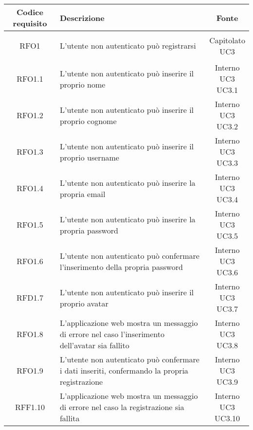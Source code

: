 \begin{longtable}{|c|p{8cm}|c|}

\hline \rowcolor{Gray}
\textbf{Codice requisito} & \textbf{Descrizione} & \textbf{Fonte} \\
\hline
\endhead

\hypertarget{RFO1}{RFO1} & L'utente non autenticato può registrarsi & \makecell*{Capitolato\\UC3} \\
\hline

\hypertarget{RFO1.1}{RFO1.1} & L'utente non autenticato può inserire il proprio nome & \makecell*{Interno\\UC3\\UC3.1} \\
\hline
\hypertarget{RFO1.2}{RFO1.2} & L'utente non autenticato può inserire il proprio cognome & \makecell*{Interno\\UC3\\UC3.2} \\
\hline
\hypertarget{RFO1.3}{RFO1.3} & L'utente non autenticato può inserire il proprio username & \makecell*{Interno\\UC3\\UC3.3} \\
\hline
\hypertarget{RFO1.4}{RFO1.4} & L'utente non autenticato può inserire la propria email & \makecell*{Interno\\UC3\\UC3.4} \\
\hline
\hypertarget{RFO1.5}{RFO1.5} & L'utente non autenticato può inserire la propria password & \makecell*{Interno\\UC3\\UC3.5} \\
\hline
\hypertarget{RFO1.6}{RFO1.6} & L'utente non autenticato può confermare l'inserimento della propria password & \makecell*{Interno\\UC3\\UC3.6} \\
\hline
\hypertarget{RFD1.7}{RFD1.7} & L'utente non autenticato può inserire il proprio avatar & \makecell*{Interno\\UC3\\UC3.7} \\
\hline
\hypertarget{RFO1.8}{RFO1.8} &  L'applicazione web mostra un messaggio di errore nel caso l'inserimento dell'avatar sia fallito & \makecell*{Interno\\UC3\\UC3.8} \\
\hline
\hypertarget{RFO1.9}{RFO1.9} & L'utente non autenticato può confermare i dati inseriti, confermando la propria registrazione & \makecell*{Interno\\UC3\\UC3.9} \\
\hline
\hypertarget{RFF1.10}{RFF1.10} & L'applicazione web mostra un messaggio di errore nel caso la registrazione sia fallita & \makecell*{Interno\\UC3\\UC3.10} \\
\hline


\end{longtable}
